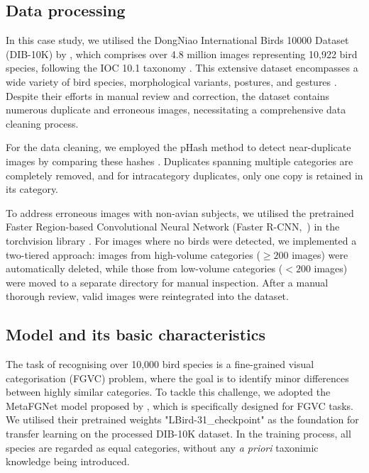 \subsection{Data processing}\label{subsec:mm-data-processing}

In this case study, we utilised the DongNiao International Birds 10000 Dataset (DIB-10K)
by \textcite{Mei2020Dongniao}, which comprises over 4.8 million images representing
10,922 bird species, following the IOC 10.1 taxonomy \parencite{Gill2021IOC}. This
extensive dataset encompasses a wide variety of bird species, morphological variants,
postures, and gestures \parencite{Mei2020Dongniao}. Despite their efforts in manual
review and correction, the dataset contains numerous duplicate and erroneous images,
necessitating a comprehensive data cleaning process.

For the data cleaning, we employed the pHash method to detect near-duplicate images
by comparing these hashes \parencite{Farid2021Overview}. Duplicates spanning multiple
categories are completely removed, and for intracategory duplicates, only one copy is
retained in its category.

To address erroneous images with non-avian subjects, we utilised the pretrained Faster
Region-based Convolutional Neural Network (Faster R-CNN,~\cite{Ren2017Faster}) in
the torchvision library \parencite{Ansel2024Pytorch}. For images where no birds were
detected, we implemented a two-tiered approach: images from high-volume categories
($\geq200$ images) were automatically deleted, while those from low-volume categories
($<200$ images) were moved to a separate directory for manual inspection.
After a manual thorough review, valid images were reintegrated into the dataset.

\subsection{Model and its basic characteristics}\label{subsec:r-model}

The task of recognising over 10,000 bird species is a
fine-grained visual categorisation (FGVC) problem, where the goal is
to identify minor differences between highly similar categories. To
tackle this challenge, we adopted the MetaFGNet model proposed by \textcite{Zhang2018Fine},
which is specifically designed for FGVC tasks. We utilised their
pretrained weights "LBird-31\_checkpoint" as the foundation for
transfer learning on the processed DIB-10K dataset. In the training process,
all species are regarded as equal categories, without any \textit{a priori} taxonimic
knowledge being introduced.

